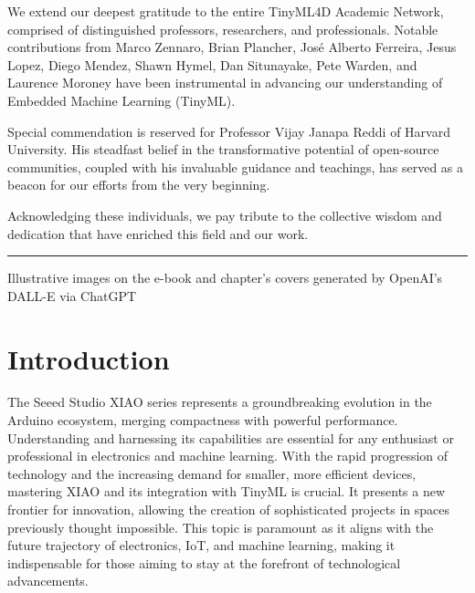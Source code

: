\documentclass[
  letterpaper,
  DIV=11,
  numbers=noendperiod]{scrreprt}
\begin{document}
We extend our deepest gratitude to the entire TinyML4D Academic Network,
comprised of distinguished professors, researchers, and professionals.
Notable contributions from Marco Zennaro, Brian Plancher, José Alberto
Ferreira, Jesus Lopez, Diego Mendez, Shawn Hymel, Dan Situnayake, Pete
Warden, and Laurence Moroney have been instrumental in advancing our
understanding of Embedded Machine Learning (TinyML).

Special commendation is reserved for Professor Vijay Janapa Reddi of
Harvard University. His steadfast belief in the transformative potential
of open-source communities, coupled with his invaluable guidance and
teachings, has served as a beacon for our efforts from the very
beginning.

Acknowledging these individuals, we pay tribute to the collective wisdom
and dedication that have enriched this field and our work.

\begin{center}\rule{0.5\linewidth}{0.5pt}\end{center}

Illustrative images on the e-book and chapter's covers generated by
OpenAI's DALL-E via ChatGPT


\hypertarget{introduction}{%
\chapter*{Introduction}\label{introduction}}


The Seeed Studio XIAO series represents a groundbreaking evolution in
the Arduino ecosystem, merging compactness with powerful performance.
Understanding and harnessing its capabilities are essential for any
enthusiast or professional in electronics and machine learning. With the
rapid progression of technology and the increasing demand for smaller,
more efficient devices, mastering XIAO and its integration with TinyML
is crucial. It presents a new frontier for innovation, allowing the
creation of sophisticated projects in spaces previously thought
impossible. This topic is paramount as it aligns with the future
trajectory of electronics, IoT, and machine learning, making it
indispensable for those aiming to stay at the forefront of technological
advancements.

\end{document}
